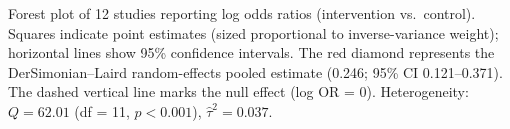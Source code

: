 \caption{Forest plot of 12 studies reporting log odds ratios (intervention vs.\ control). Squares indicate point estimates (sized proportional to inverse-variance weight); horizontal lines show 95\% confidence intervals. The red diamond represents the DerSimonian--Laird random-effects pooled estimate (0.246; 95\% CI 0.121--0.371). The dashed vertical line marks the null effect (log OR = 0). Heterogeneity: $Q = 62.01$ (df = 11, $p < 0.001$), $\hat{\tau}^2 = 0.037$.}
